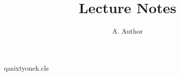 \begin{filecontents*}[overwrite]{qasixtyonek.cls}
\newcommand\phone[1]{\gdef\@phone{#1}}
\newcommand\email[1]{\gdef\@email{#1}}
\renewcommand\@maketitle{\begin{center}{\LARGE \@title\par}{\large \@author\par}\end{center}
  E-mail: \@email, tel.\ \@phone\par}
\end{filecontents*}
\documentclass{qasixtyonek}
\title{Lecture Notes}
\author{A. Author}

\maketitle
Text.

